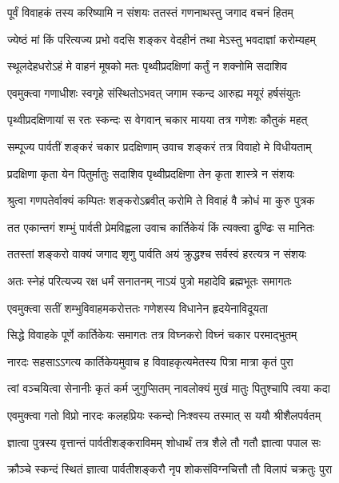 \twolineshloka
{पूर्वं विवाहकं तस्य करिष्यामि न संशयः}
{ततस्तं गणनाथस्तु जगाद वचनं हितम्} %

\twolineshloka
{ज्येष्ठं मां किं परित्यज्य प्रभो वदसि शङ्कर}
{वेदहीनं तथा मेऽस्तु भवदाज्ञां करोम्यहम्} %

\twolineshloka
{स्थूलदेहधरोऽहं मे वाहनं मूषको मतः}
{पृथ्वीप्रदक्षिणां कर्तुं न शक्नोमि सदाशिव} %

\twolineshloka
{एवमुक्त्वा गणाधीशः स्वगृहे संस्थितोऽभवत्}
{जगाम स्कन्द आरुह्य मयूरं हर्षसंयुतः} %

\twolineshloka
{पृथ्वीप्रदक्षिणायां स रतः स्कन्दः स वेगवान्}
{चकार मायया तत्र गणेशः कौतुकं महत्} %

\twolineshloka
{सम्पूज्य पार्वतीं शङ्करं चकार प्रदक्षिणाम्}
{उवाच शङ्करं तत्र विवाहो मे विधीयताम्} %

\twolineshloka
{प्रदक्षिणा कृता येन पितुर्मातुः सदाशिव}
{पृथ्वीप्रदक्षिणा तेन कृता शास्त्रे न संशयः} %

\twolineshloka
{श्रुत्वा गणपतेर्वाक्यं कम्पितः शङ्करोऽब्रवीत्}
{करोमि ते विवाहं वै क्रोधं मा कुरु पुत्रक} %

\twolineshloka
{तत एकान्तगं शम्भुं पार्वती प्रेमविह्वला}
{उवाच कार्तिकेयं किं त्यक्त्वा ढुण्ढिः स मानितः} %

\twolineshloka
{ततस्तां शङ्करो वाक्यं जगाद श‍ृणु पार्वति}
{अयं क्रुद्धश्च सर्वस्वं हरत्यत्र न संशयः} %

\twolineshloka
{अतः स्नेहं परित्यज्य रक्ष धर्मं सनातनम्}
{नाऽयं पुत्रो महादेवि ब्रह्मभूतः समागतः} %

\twolineshloka
{एवमुक्त्वा सतीं शम्भुविवाहमकरोत्ततः}
{गणेशस्य विधानेन हृदयेनाविदूयता} %

\twolineshloka
{सिद्धे विवाहके पूर्णे कार्तिकेयः समागतः}
{तत्र विघ्नकरो विघ्नं चकार परमाद्भुतम्} %

\twolineshloka
{नारदः सहसाऽऽगत्य कार्तिकेयमुवाच ह}
{विवाहकृत्यमेतस्य पित्रा मात्रा कृतं पुरा} %

\twolineshloka
{त्वां वञ्चयित्वा सेनानीः कृतं कर्म जुगुप्सितम्}
{नावलोक्यं मुखं मातुः पितुश्चापि त्वया कदा} %

\twolineshloka
{एवमुक्त्वा गतो विप्रो नारदः कलहप्रियः}
{स्कन्दो निःश्वस्य तस्मात् स ययौ श्रीशैलपर्वतम्} %

\twolineshloka
{ज्ञात्वा पुत्रस्य वृत्तान्तं पार्वतीशङ्कराविमम्}
{शोधार्थं तत्र शैले तौ गतौ ज्ञात्वा पपाल सः} %

\twolineshloka
{क्रौञ्चे स्कन्दं स्थितं ज्ञात्वा पार्वतीशङ्करौ नृप}
{शोकसंविग्नचित्तौ तौ विलापं चक्रतुः पुरा} %

